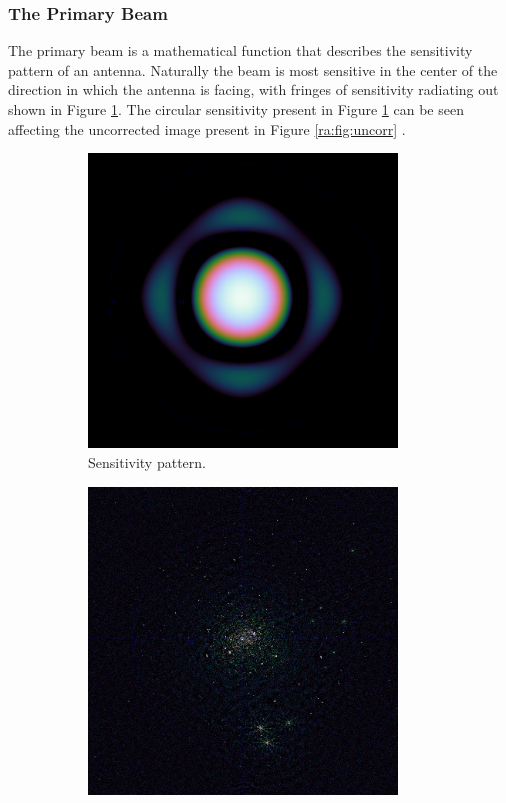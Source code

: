 \subsubsection{The Primary Beam}\label{ra:ssec:tpb}
The primary beam is a mathematical function that describes the sensitivity pattern of an antenna. Naturally the beam is most sensitive in the center of the direction in which the antenna is facing, with fringes of sensitivity radiating out shown in Figure \ref{ra:fig:beam}. The circular sensitivity present in Figure \ref{ra:fig:beam} can be seen affecting the uncorrected image present in Figure \ref{ra:fig:uncorr} \citep{thompson2008interferometry}.
%
\begin{figure}[H]
  \begin{subfigure}{0.45\textwidth}
	\centering
	\includegraphics[width=0.9\textwidth]{Images/beam.png}
	\caption{Sensitivity pattern.}
	\label{ra:fig:beam}
  \end{subfigure}
  \begin{subfigure}{0.45\textwidth}
	\centering
	\includegraphics[width=0.9\textwidth]{Images/uncorrected-image.png}

\end{subfigure}
\end{figure}
